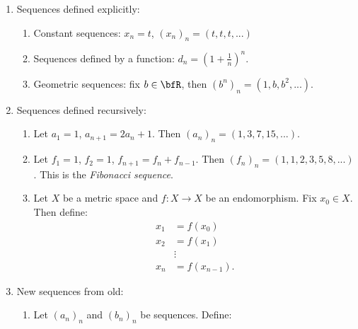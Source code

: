     \begin{example}
        \phantom{a}
        \begin{enumerate}[label = (\arabic*)]
            \item Sequences defined explicitly:
                \begin{enumerate}[label = (\roman*)]
                    \item Constant sequences: $x_n = t$, $(x_n)_n  = (t,t,t,...)$
                    \item Sequences defined by a function: $d_n = \left(1 + \frac{1}{n}\right)^n$.
                    \item Geometric sequences: fix $b \in \bfR$, then $(b^n)_n = (1,b,b^2,...)$.    
                \end{enumerate}
            \item Sequences defined recursively:
                \begin{enumerate}[label = (\roman*)]
                    \item Let $a_1 = 1$, $a_{n+1} = 2a_n + 1$. Then $(a_n)_n = (1,3,7,15,...)$.
                    \item Let $f_1 = 1$, $f_2 = 1$, $f_{n+1} = f_n + f_{n-1}$. Then $(f_n)_n = (1,1,2,3,5,8,...)$. This is the \textit{Fibonacci sequence}.
                    \item Let $X$ be a metric space and $f:X \rightarrow X$ be an endomorphism. Fix $x_0 \in X$. Then define:
                        \begin{equation*}
                        \begin{split}
                            x_1 &= f(x_0) \\
                            x_2 &= f(x_1) \\
                            &\vdots \\
                            x_n &= f(x_{n-1}).
                        \end{split}
                        \end{equation*}  
                \end{enumerate}
            \item New sequences from old:
                \begin{enumerate}[label = (\roman*)]
                    \item Let $(a_n)_n$ and $(b_n)_n$ be sequences. Define:
                        \begin{equation*}
                        \begin{split}

\end{split}
\end{equation*}
\end{enumerate}
\end{enumerate}
\end{example}
